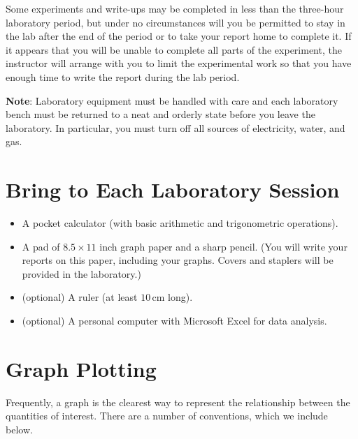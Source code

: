 Some experiments and write-ups may be completed in less than the three-hour laboratory period, but under no circumstances will you be permitted to stay in the lab after the end of the period or to take your report home to complete it.  If it appears that you will be unable to complete all parts of the experiment, the instructor will arrange with you to limit the experimental work so that you have enough time to write the report during the lab period.\myskip

\textbf{Note}: Laboratory equipment must be handled with care and each laboratory bench must be returned to a neat and orderly state before you leave the laboratory.  In particular, you must turn off all sources of electricity, water, and gas.

\section{Bring to Each Laboratory Session}

\begin{itemize}
    \item A pocket calculator (with basic arithmetic and trigonometric operations).

    \item A pad of $8.5 \times 11$ inch graph paper and a sharp pencil.  (You will write your reports on this paper, including your graphs.  Covers and staplers will be provided in the laboratory.)

    \item (optional) A ruler (at least $10\,\mathrm{cm}$ long).
    \item (optional) A personal computer with Microsoft Excel for data analysis.
\end{itemize}

\section{Graph Plotting}

Frequently, a graph is the clearest way to represent the relationship between the quantities of interest.  There are a number of conventions, which we include below.

